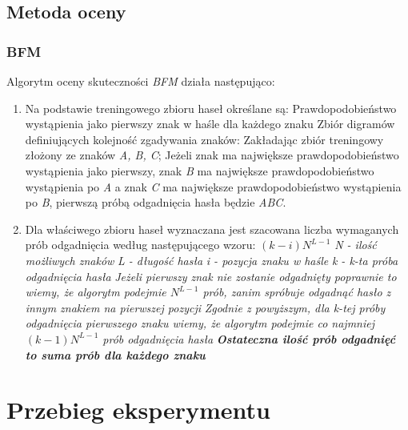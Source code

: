 \documentclass{article}
\begin{document}
\subsection{Metoda oceny}
\subsubsection{BFM}
Algorytm oceny skuteczności \textit{BFM} działa następująco:
\begin{enumerate}
	\item Na podstawie treningowego zbioru haseł określane są:
		\subitem Prawdopodobieństwo wystąpienia jako pierwszy znak w haśle dla każdego znaku
		\subitem Zbiór digramów definiujących kolejność zgadywania znaków:
		\subsubitem Zakładając zbiór treningowy złożony ze znaków \textit{A, B, C}; Jeżeli znak  ma największe prawdopodobieństwo wystąpienia jako pierwszy, znak \textit{B} ma największe prawdopodobieństwo wystąpienia po \textit{A} a znak \textit{C} ma największe prawdopodobieństwo wystąpienia po \textit{B}, pierwszą próbą odgadnięcia hasła będzie \textit{ABC}.
	\item Dla właściwego zbioru haseł wyznaczana jest szacowana liczba wymaganych prób odgadnięcia według następującego wzoru: $ (k-i)N^{L-1} $
		\subitem \textit{N - ilość możliwych znaków}
		\subitem \textit{L - długość hasła}
		\subitem \textit{i - pozycja znaku w haśle}
		\subitem \textit{k - k-ta próba odgadnięcia hasła}
		\subitem \textit{Jeżeli pierwszy znak nie zostanie odgadnięty poprawnie to wiemy, że algorytm podejmie $ N^{L-1} $ prób, zanim spróbuje odgadnąć hasło z innym znakiem na pierwszej pozycji}
		\subitem \textit{Zgodnie z powyższym, dla k-tej próby odgadnięcia pierwszego znaku wiemy, że algorytm podejmie co najmniej $ (k-1)N^{L-1} $ prób odgadnięcia hasła}
		\subitem \textbf{\textit{Ostateczna ilość prób odgadnięć to suma prób dla każdego znaku}}
\end{enumerate}

\newpage
\section{Przebieg eksperymentu}

\end{document}
